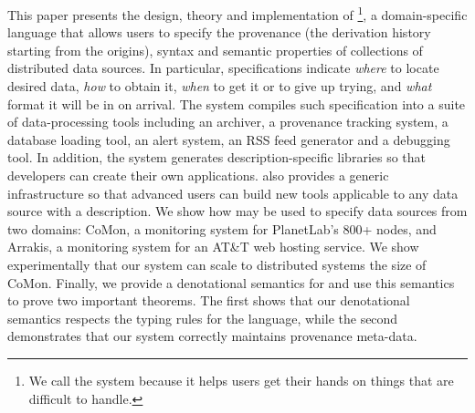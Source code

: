 
This paper presents the design, theory and implementation of
\padsd{}\footnote{We call the system \padsd{} because it helps users
get their hands on things that are difficult to handle.
}, a  domain-specific language that allows users to
specify the provenance (the derivation history starting from the origins), 
syntax and semantic properties of 
collections of distributed data sources. In particular, \padsd{}
specifications indicate 
{\em where} to locate desired data, {\em how} to obtain it, {\em
when} to get it or to give up trying, and {\em what}
format it will be in on arrival.  The \padsd{} system compiles such
specification into a suite of data-processing tools including 
an archiver, a provenance tracking system, a database loading tool, 
an alert system, an RSS feed generator and a
debugging tool.  In addition, the system generates description-specific
libraries so that developers can create their
own applications. \padsd{} also provides a generic infrastructure
so that advanced users can build new tools applicable to any 
data source with a \padsd{} description.
We show how \padsd{} may be used to specify data sources from two domains:
CoMon, a monitoring system for PlanetLab's 800+ nodes, and Arrakis, a monitoring
system for an AT\&T web hosting service.  
We show experimentally that our system can scale to distributed
systems the size of CoMon.  
Finally, we provide a
denotational semantics for \padsd{} and use this semantics to prove two important
theorems.  The first shows that our denotational semantics respects the
typing rules for the language, while the second demonstrates that our 
system correctly maintains provenance meta-data.






